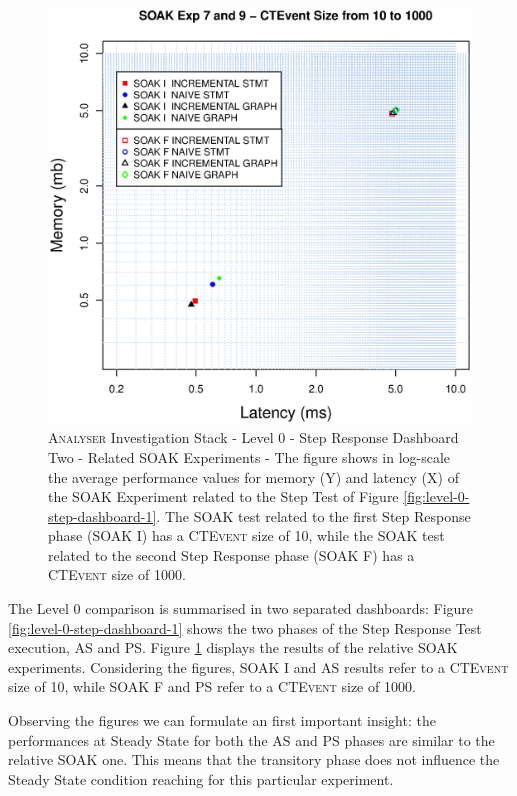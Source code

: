 \begin{figure}[htbp]
	\centering
	\includegraphics[width=0.90\linewidth]{images/level-0-step-dashboard-2}	
	\caption[\textsc{Analyser} Investigation Stack - Level 0 - Step Response Dashboard Two - Related SOAK Experiments]{
\textsc{Analyser} Investigation Stack - Level 0 - Step Response Dashboard Two - Related SOAK Experiments - The figure shows in log-scale the average performance values for memory (Y) and latency (X) of the SOAK Experiment related to the Step Test of Figure \ref{fig:level-0-step-dashboard-1}. The SOAK test related to the first Step Response phase (SOAK I) has a \textsc{CTEvent} size of 10, while the SOAK test related to the second Step Response phase (SOAK F) has a \textsc{CTEvent} size of 1000.}
	\label{fig:level-0-step-dashboard-2}
\end{figure}

The Level 0 comparison is summarised in two separated dashboards: Figure \ref{fig:level-0-step-dashboard-1} shows the two phases of the Step Response Test execution, AS and PS. Figure \ref{fig:level-0-step-dashboard-2} displays the results of the relative SOAK experiments. Considering the figures, SOAK I and AS results refer to a \textsc{CTEvent} size of 10, while SOAK F and PS refer to a \textsc{CTEvent} size of 1000.

Observing the figures we can formulate an first important insight: the performances at Steady State for both the AS and PS phases are similar to the relative SOAK one. This means that the transitory phase does not influence the Steady State condition reaching for this particular experiment.

